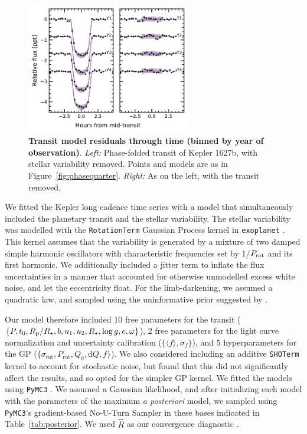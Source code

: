 \documentclass[12pt,modern,twocolumn,tighten]{aastex63}
\begin{document}
\begin{figure}[t]
	\begin{center}
		\leavevmode
		\includegraphics[width=0.64\textwidth]{f10.pdf}
	\end{center}
	\vspace{-0.7cm}
	\caption{
    {\bf Transit model residuals through time (binned by year of observation)}.  
    {\it Left:}
    Phase-folded transit of Kepler 1627b, with stellar variability
    removed.  Points and models are as
    in Figure~\ref{fig:phasequarter}.
    {\it Right:}
    As on the left, with the transit removed.
		\label{fig:phaseyear}
	}
\end{figure}

We fitted the Kepler long cadence time series with a model that
simultaneously included the planetary transit and the stellar
variability.  The stellar variability was modelled with the
\texttt{RotationTerm} Gaussian Process kernel in \texttt{exoplanet}
\citep{exoplanet:exoplanet}.  This kernel assumes that the variability
is generated by a mixture of two damped simple harmonic oscillators
with characteristic frequencies set by 1/$P_{\rm rot}$ and its first
harmonic.  We additionally included a jitter term to inflate
the flux uncertainties in a manner that accounted for otherwise
unmodelled excess white noise, and let the eccentricity float.  For
the limb-darkening, we assumed a quadratic law, and sampled using the
uninformative prior suggested by \citet{exoplanet:kipping13}.

Our model therefore included 10 free parameters for the
transit ($\{P, t_0, R_{\rm p}/R_\star, b, u_1 ,u_2 ,R_\star, \log g,
e, \omega \}$), 2 free parameters for the light curve
normalization and uncertainty calibration ($\{\langle f \rangle, 
\sigma_f \}$), and 5 hyperparameters for the GP
($\{\sigma_{\mathrm{rot}}, P_{\mathrm{rot}}, Q_0,
\mathrm{d}Q, f \}$).  We also considered including an additive
\texttt{SHOTerm} kernel to account for stochastic noise, but found
that this did not significantly affect the results, and so opted for
the simpler GP kernel.  We fitted the models using \texttt{PyMC3}
\citep{salvatier_2016_PyMC3,exoplanet:theano}.  
We assumed a Gaussian likelihood, and
after initializing
each model with the parameters of the maximum {\it a posteriori}
model, we sampled using
\texttt{PyMC3}'s gradient-based No-U-Turn Sampler
\citep{hoffman_no-u-turn_2014} in these bases indicated in Table~\ref{tab:posterior}.
We used $\hat{R}$ as our convergence
diagnostic \citep{gelman_inference_1992}.
\end{document}
